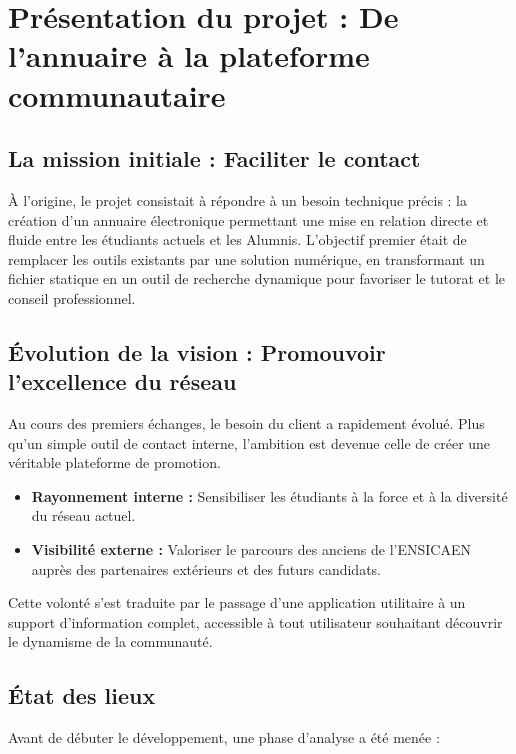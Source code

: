\documentclass[a4paper,12pt]{article}
\begin{document}
\newpage
\thispagestyle{empty}
{
    \hypersetup{linkcolor=black}
    \tableofcontents
}
\newpage

\setcounter{page}{1}

\section{Présentation du projet : De l'annuaire à la plateforme communautaire}

\subsection{La mission initiale : Faciliter le contact}
À l'origine, le projet consistait à répondre à un besoin technique précis : la création d'un annuaire électronique permettant une mise en relation directe et fluide entre les étudiants actuels et les Alumnis. L'objectif premier était de remplacer les outils existants par une solution numérique, en transformant un fichier statique en un outil de recherche dynamique pour favoriser le tutorat et le conseil professionnel.

\subsection{Évolution de la vision : Promouvoir l'excellence du réseau}
Au cours des premiers échanges, le besoin du client a rapidement évolué. Plus qu'un simple outil de contact interne, l'ambition est devenue celle de créer une véritable plateforme de promotion.

\begin{itemize}[label=\textbullet, itemsep=5pt]
    \item \textbf{Rayonnement interne :} Sensibiliser les étudiants à la force et à la diversité du réseau actuel.
    \item \textbf{Visibilité externe :} Valoriser le parcours des anciens de l'ENSICAEN auprès des partenaires extérieurs et des futurs candidats.
\end{itemize}

Cette volonté s'est traduite par le passage d'une application utilitaire à un support d'information complet, accessible à tout utilisateur souhaitant découvrir le dynamisme de la communauté.

\subsection{État des lieux}
Avant de débuter le développement, une phase d'analyse a été menée :
\end{document}
